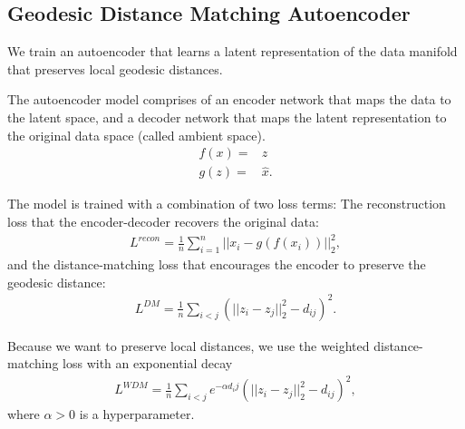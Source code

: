 \documentclass{article}
\theoremstyle{plain}
\theoremstyle{definition}
\theoremstyle{remark}
\newcommand{\xin}[1]{\textcolor{teal}{[XS: #1]}}
\begin{document}
\subsection{Geodesic Distance Matching Autoencoder}
\par We train an autoencoder that learns a latent representation of the data manifold that preserves local geodesic distances. 
\par The autoencoder model comprises of an encoder network that maps the data to the latent space, and a decoder network that maps the latent representation to the original data space (called ambient space). 
\begin{align}
    f(x)=&z\\
    g(z)=&\hat x.
\end{align}
\par The model is trained with a combination of two loss terms: 
The reconstruction loss that the encoder-decoder recovers the original data:
\begin{align}
    L^{recon}=\frac{1}{n}\sum_{i=1}^n||x_i-g(f(x_i))||_2^2,
\end{align}
and the distance-matching loss that encourages the encoder to preserve the geodesic distance:
\begin{align}
    L^{DM}=\frac{1}{n}\sum_{i<j}\left(||z_i-z_j||^2_2-d_{ij}\right)^2.
\end{align}
\par Because we want to preserve local distances, we use the weighted distance-matching loss with an exponential decay 
\begin{align}
    L^{WDM}=\frac{1}{n}\sum_{i<j}e^{-\alpha d_ij}\left(||z_i-z_j||^2_2-d_{ij}\right)^2,
\end{align}
where $\alpha>0$ is a hyperparameter.
\end{document}
